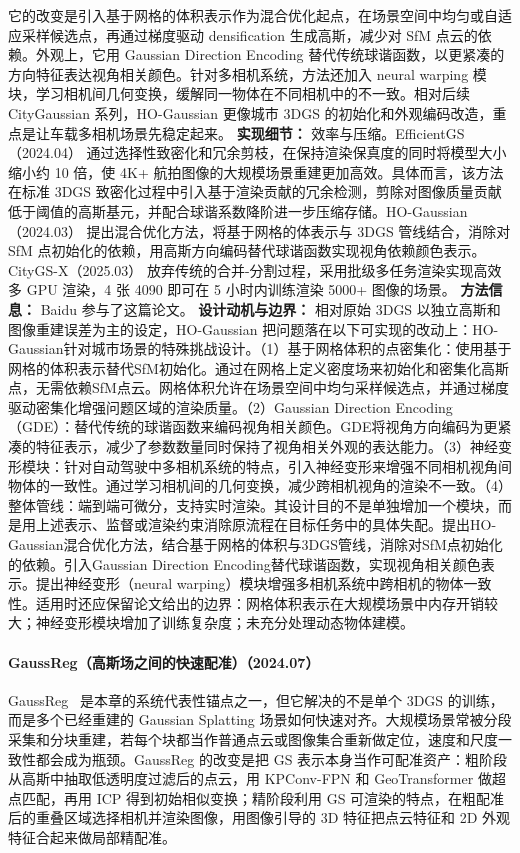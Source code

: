 它的改变是引入基于网格的体积表示作为混合优化起点，在场景空间中均匀或自适应采样候选点，再通过梯度驱动 densification 生成高斯，减少对 SfM 点云的依赖。外观上，它用 Gaussian Direction Encoding 替代传统球谐函数，以更紧凑的方向特征表达视角相关颜色。针对多相机系统，方法还加入 neural warping 模块，学习相机间几何变换，缓解同一物体在不同相机中的不一致。相对后续 CityGaussian 系列，HO-Gaussian 更像城市 3DGS 的初始化和外观编码改造，重点是让车载多相机场景先稳定起来。
\textbf{实现细节：} 效率与压缩。EfficientGS（2024.04） 通过选择性致密化和冗余剪枝，在保持渲染保真度的同时将模型大小缩小约 10 倍，使 4K+ 航拍图像的大规模场景重建更加高效。具体而言，该方法在标准 3DGS 致密化过程中引入基于渲染贡献的冗余检测，剪除对图像质量贡献低于阈值的高斯基元，并配合球谐系数降阶进一步压缩存储。HO-Gaussian（2024.03） 提出混合优化方法，将基于网格的体表示与 3DGS 管线结合，消除对 SfM 点初始化的依赖，用高斯方向编码替代球谐函数实现视角依赖颜色表示。CityGS-X（2025.03） 放弃传统的合并-分割过程，采用批级多任务渲染实现高效多 GPU 渲染，4 张 4090 即可在 5 小时内训练渲染 5000+ 图像的场景。
\textbf{方法信息：} Baidu 参与了这篇论文。
\textbf{设计动机与边界：} 相对原始 3DGS 以独立高斯和图像重建误差为主的设定，HO-Gaussian 把问题落在以下可实现的改动上：HO-Gaussian针对城市场景的特殊挑战设计。（1）基于网格体积的点密集化：使用基于网格的体积表示替代SfM初始化。通过在网格上定义密度场来初始化和密集化高斯点，无需依赖SfM点云。网格体积允许在场景空间中均匀采样候选点，并通过梯度驱动密集化增强问题区域的渲染质量。（2）Gaussian Direction Encoding（GDE）：替代传统的球谐函数来编码视角相关颜色。GDE将视角方向编码为更紧凑的特征表示，减少了参数数量同时保持了视角相关外观的表达能力。（3）神经变形模块：针对自动驾驶中多相机系统的特点，引入神经变形来增强不同相机视角间物体的一致性。通过学习相机间的几何变换，减少跨相机视角的渲染不一致。（4）整体管线：端到端可微分，支持实时渲染。其设计目的不是单独增加一个模块，而是用上述表示、监督或渲染约束消除原流程在目标任务中的具体失配。提出HO-Gaussian混合优化方法，结合基于网格的体积与3DGS管线，消除对SfM点初始化的依赖。引入Gaussian Direction Encoding替代球谐函数，实现视角相关颜色表示。提出神经变形（neural warping）模块增强多相机系统中跨相机的物体一致性。适用时还应保留论文给出的边界：网格体积表示在大规模场景中内存开销较大；神经变形模块增加了训练复杂度；未充分处理动态物体建模。
\paragraph{GaussReg（高斯场之间的快速配准）（2024.07）}
GaussReg~\cite{2407_05254} 是本章的系统代表性锚点之一，但它解决的不是单个 3DGS 的训练，而是多个已经重建的 Gaussian Splatting 场景如何快速对齐。大规模场景常被分段采集和分块重建，若每个块都当作普通点云或图像集合重新做定位，速度和尺度一致性都会成为瓶颈。GaussReg 的改变是把 GS 表示本身当作可配准资产：粗阶段从高斯中抽取低透明度过滤后的点云，用 KPConv-FPN 和 GeoTransformer 做超点匹配，再用 ICP 得到初始相似变换；精阶段利用 GS 可渲染的特点，在粗配准后的重叠区域选择相机并渲染图像，用图像引导的 3D 特征把点云特征和 2D 外观特征合起来做局部精配准。

